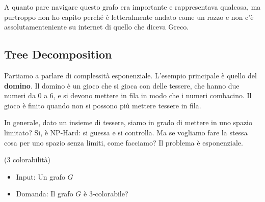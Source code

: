 A quanto pare navigare questo grafo era importante e rappresentava qualcosa, ma
purtroppo non ho capito perché è letteralmente andato come un razzo e non c'è
assolutamenteniente su internet di quello che diceva Greco.

\subsection{Tree Decomposition}

Partiamo a parlare di complessità esponenziale. L'esempio principale è quello
del \textbf{domino}. Il domino è un gioco che si gioca con delle tessere, che
hanno due numeri da 0 a 6, e si devono mettere in fila in modo che i numeri
combacino. Il gioco è finito quando non si possono più mettere tessere in fila.

In generale, dato un insieme di tessere, siamo in grado di mettere in uno
spazio limitato? Si, è NP-Hard: si guessa e si controlla. Ma se vogliamo fare
la stessa cosa per uno spazio senza limiti, come facciamo? Il problema è
esponenziale.

\begin{esempio}(3 colorabilità)
\end{esempio}

\begin{itemize}
    \item Input: Un grafo $G$
    \item Domanda: Il grafo $G$ è 3-colorabile?
\end{itemize}

\begin{figure}[H]
    \begin{center}
    \end{center}
\end{figure}

